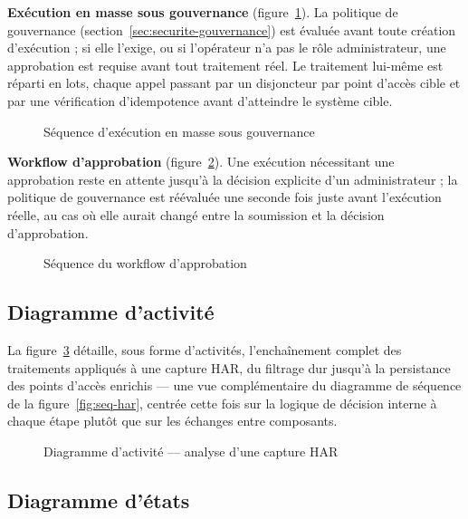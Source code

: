 \textbf{Exécution en masse sous gouvernance} (figure~\ref{fig:seq-bulk-gouvernance}). La politique de gouvernance (section~\ref{sec:securite-gouvernance}) est évaluée avant toute création d'exécution ; si elle l'exige, ou si l'opérateur n'a pas le rôle administrateur, une approbation est requise avant tout traitement réel. Le traitement lui-même est réparti en lots, chaque appel passant par un disjoncteur par point d'accès cible et par une vérification d'idempotence avant d'atteindre le système cible.

\begin{figure}[H]
  \centering
  \caption{Séquence d'exécution en masse sous gouvernance}
  \label{fig:seq-bulk-gouvernance}
\end{figure}

\textbf{Workflow d'approbation} (figure~\ref{fig:seq-approbation}). Une exécution nécessitant une approbation reste en attente jusqu'à la décision explicite d'un administrateur ; la politique de gouvernance est réévaluée une seconde fois juste avant l'exécution réelle, au cas où elle aurait changé entre la soumission et la décision d'approbation.

\begin{figure}[H]
  \centering
  \caption{Séquence du workflow d'approbation}
  \label{fig:seq-approbation}
\end{figure}

\subsection{Diagramme d'activité}

La figure~\ref{fig:activite-har} détaille, sous forme d'activités, l'enchaînement complet des traitements appliqués à une capture HAR, du filtrage dur jusqu'à la persistance des points d'accès enrichis — une vue complémentaire du diagramme de séquence de la figure~\ref{fig:seq-har}, centrée cette fois sur la logique de décision interne à chaque étape plutôt que sur les échanges entre composants.

\begin{figure}[H]
  \centering
  \caption{Diagramme d'activité — analyse d'une capture HAR}
  \label{fig:activite-har}
\end{figure}

\subsection{Diagramme d'états}


